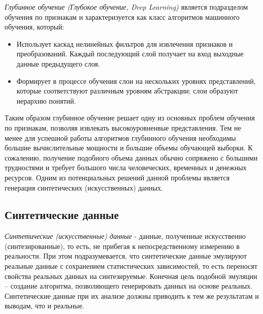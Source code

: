 \textit{Глубинное обучение (Глубокое обучение, Deep Learning)} является подразделом обучения по признакам и характеризуется как класс алгоритмов машинного обучения, \cite{deng-yu} который:

\begin{itemize}

\item Использует каскад нелинейных фильтров для извлечения признаков и преобразований. Каждый последующий слой получает на вход выходные данные предыдущего слоя.

\item Формирует в процессе обучения слои на нескольких уровнях представлений, которые соответствуют различным уровням абстракции; слои образуют иерархию понятий.

\end{itemize}


Таким образом глубинное обучение решает одну из основных проблем обучения по признакам, позволяя извлекать высокоуровненвые представления. Тем не менее для успешной работы алгоритмов глубинного обучения необходимы большие вычислительные мощности и большие объемы обучающей выборки. К сожалению, получение подобного объема данных обычно сопряжено с большими трудностями и требует большого числа человеческих, временных и денежных ресурсов. Одним из потенциальных решений данной проблемы является генерация синтетических (искусственных) данных. 



\subsection{Синтетические данные}

\textit{Синтетические (искусственные) данные} - данные, полученные искусственно (синтезированные), то есть, не прибегая к непосредственному измерению в реальности. При этом подразумевается, что синтетические данные эмулируют реальные данные с сохранением статистических зависимостей, то есть переносят свойства реальных данных на синтезируемые. Конечная цель подобной эмуляции -- создание алгоритма, позволяющего генерировать данных на основе реальных. Синтетические данные при их анализе должны приводить к тем же результатам и выводам, что и реальные.

